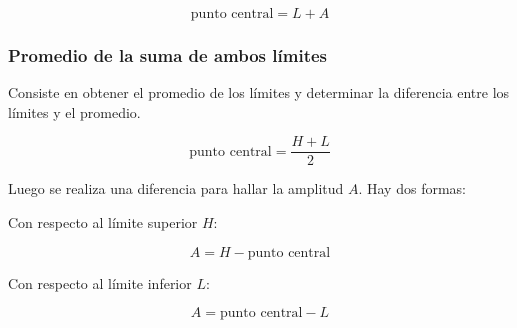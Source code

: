 \[
  \text{punto central}=L+A
\]

\subsubsection{Promedio de la suma de ambos límites}

Consiste en obtener el promedio de los límites y determinar la diferencia entre los límites y el promedio.

\[
  \text{punto central} = \dfrac{H+L}{2}
\]

Luego se realiza una diferencia para hallar la amplitud $A$. Hay dos formas:

Con respecto al límite superior $H$:

\[
  A = H - \text{punto central}
\]

Con respecto al límite inferior $L$:

\[
  A = \text{punto central} - L
\]
